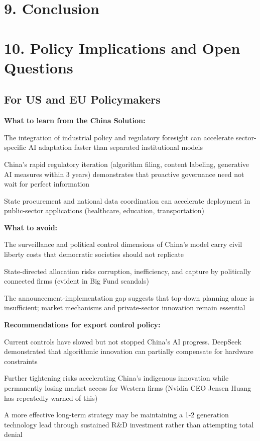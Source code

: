 \documentclass[11pt,a4paper]{article}
\begin{document}
\section{9. Conclusion}

\section{10. Policy Implications and Open Questions}

\subsection{For US and EU Policymakers}

\textbf{What to learn from the China Solution:}
\item The integration of industrial policy and regulatory foresight can accelerate sector-specific AI adaptation faster than separated institutional models
\item China's rapid regulatory iteration (algorithm filing, content labeling, generative AI measures within 3 years) demonstrates that proactive governance need not wait for perfect information
\item State procurement and national data coordination can accelerate deployment in public-sector applications (healthcare, education, transportation)

\textbf{What to avoid:}
\item The surveillance and political control dimensions of China's model carry civil liberty costs that democratic societies should not replicate
\item State-directed allocation risks corruption, inefficiency, and capture by politically connected firms (evident in Big Fund scandals)
\item The announcement-implementation gap suggests that top-down planning alone is insufficient; market mechanisms and private-sector innovation remain essential

\textbf{Recommendations for export control policy:}
\item Current controls have slowed but not stopped China's AI progress. DeepSeek demonstrated that algorithmic innovation can partially compensate for hardware constraints
\item Further tightening risks accelerating China's indigenous innovation while permanently losing market access for Western firms (Nvidia CEO Jensen Huang has repeatedly warned of this)
\item A more effective long-term strategy may be maintaining a 1-2 generation technology lead through sustained R\&D investment rather than attempting total denial
\end{document}
